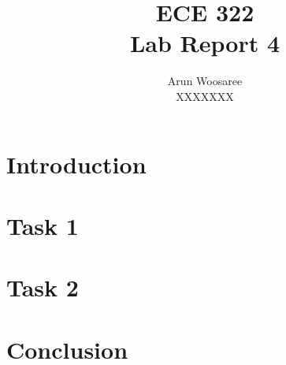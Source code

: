 \documentclass[letterpaper]{article}
\title{ECE 322 \\
Lab Report 4}
\author{Arun Woosaree\\
XXXXXXX}
\begin{document}
\maketitle

\section{Introduction}


\section{Task 1}



\section{Task 2}


\section{Conclusion}



\vfill
\appendix

%
%
%

%
%

\end{document}
